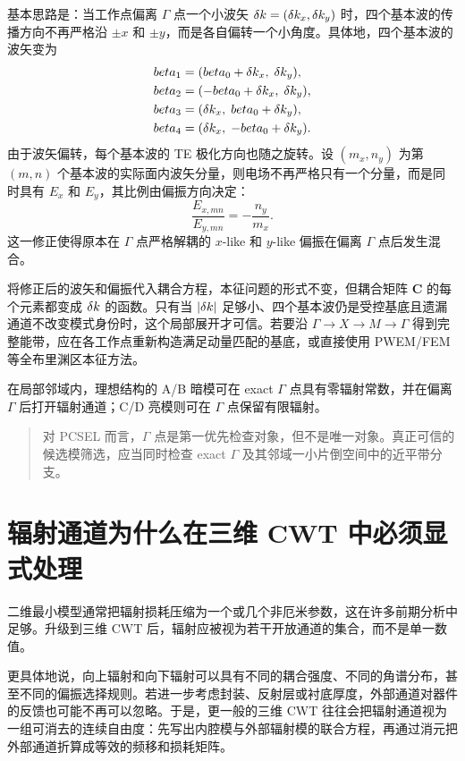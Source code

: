 基本思路是：当工作点偏离 $\Gamma$ 点一个小波矢 $\delta k=(\delta k_x,\delta k_y)$ 时，四个基本波的传播方向不再严格沿 $\pm x$ 和 $\pm y$，而是各自偏转一个小角度。具体地，四个基本波的波矢变为
\begin{align}
beta_1 &= (beta_0+\delta k_x,\;\delta k_y),\notag\\
beta_2 &= (-beta_0+\delta k_x,\;\delta k_y),\notag\\
beta_3 &= (\delta k_x,\;beta_0+\delta k_y),\notag\\
beta_4 &= (\delta k_x,\;-beta_0+\delta k_y).
\label{eq:3d_cwt_non_gamma_kvec}
\end{align}
由于波矢偏转，每个基本波的 TE 极化方向也随之旋转。设 $(m_x,n_y)$ 为第 $(m,n)$ 个基本波的实际面内波矢分量，则电场不再严格只有一个分量，而是同时具有 $E_x$ 和 $E_y$，其比例由偏振方向决定：
\begin{equation}
\frac{E_{x,mn}}{E_{y,mn}} = -\frac{n_y}{m_x}.
\label{eq:3d_cwt_polarization_tilt}
\end{equation}
这一修正使得原本在 $\Gamma$ 点严格解耦的 $x$-like 和 $y$-like 偏振在偏离 $\Gamma$ 点后发生混合。

将修正后的波矢和偏振代入耦合方程，本征问题的形式不变，但耦合矩阵 $\bm{C}$ 的每个元素都变成 $\delta k$ 的函数。只有当 $|\delta k|$ 足够小、四个基本波仍是受控基底且遗漏通道不改变模式身份时，这个局部展开才可信。若要沿 $\Gamma\to X\to M\to\Gamma$ 得到完整能带，应在各工作点重新构造满足动量匹配的基底，或直接使用 PWEM/FEM 等全布里渊区本征方法。

在局部邻域内，理想结构的 A/B 暗模可在 exact $\Gamma$ 点具有零辐射常数，并在偏离 $\Gamma$ 后打开辐射通道；C/D 亮模则可在 $\Gamma$ 点保留有限辐射。

\begin{quote}
对 PCSEL 而言，$\Gamma$ 点是第一优先检查对象，但不是唯一对象。真正可信的候选模筛选，应当同时检查 exact $\Gamma$ 及其邻域一小片倒空间中的近平带分支。
\end{quote}

\section{辐射通道为什么在三维 CWT 中必须显式处理}
二维最小模型通常把辐射损耗压缩为一个或几个非厄米参数，这在许多前期分析中足够。升级到三维 CWT 后，辐射应被视为若干开放通道的集合，而不是单一数值。

更具体地说，向上辐射和向下辐射可以具有不同的耦合强度、不同的角谱分布，甚至不同的偏振选择规则。若进一步考虑封装、反射层或衬底厚度，外部通道对器件的反馈也可能不再可以忽略。于是，更一般的三维 CWT 往往会把辐射通道视为一组可消去的连续自由度：先写出内腔模与外部辐射模的联合方程，再通过消元把外部通道折算成等效的频移和损耗矩阵。

